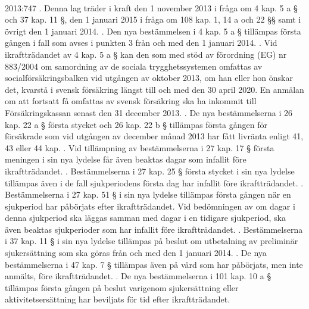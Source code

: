\documentclass[a4paper,notitlepage,openany,10pt]{book}
\begin{document}
\paragraph*{}
2013:747
. Denna lag träder i kraft den 1 november 2013 i fråga om 4 kap. 5 a § och 37 kap. 11 §, den 1 januari 2015 i fråga om 108 kap. 1, 14 a och 22 §§ samt i övrigt den 1 januari 2014.
. Den nya bestämmelsen i 4 kap. 5 a § tillämpas första gången i fall som avses i punkten 3 från och med den 1 januari 2014.
. Vid ikraftträdandet av 4 kap. 5 a § kan den som med stöd av förordning (EG) nr 883/2004 om samordning av de sociala trygghetssystemen omfattas av socialförsäkringsbalken vid utgången av oktober 2013, om han eller hon önskar det, kvarstå i svensk försäkring längst till och med den 30 april 2020. En anmälan om att fortsatt få omfattas av svensk försäkring ska ha inkommit till Försäkringskassan senast den 31 december 2013.
. De nya bestämmelserna i 26 kap. 22 a § första stycket och 26 kap. 22 b § tillämpas första gången för försäkrade som vid utgången av december månad 2013 har fått livränta enligt 41, 43 eller 44 kap.
. Vid tillämpning av bestämmelserna i 27 kap. 17 § första meningen i sin nya lydelse får även beaktas dagar som infallit före ikraftträdandet.
. Bestämmelserna i 27 kap. 25 § första stycket i sin nya lydelse tillämpas även i de fall sjukperiodens första dag har infallit före ikraftträdandet.
. Bestämmelserna i 27 kap. 51 § i sin nya lydelse tillämpas första gången när en sjukperiod har påbörjats efter ikraftträdandet. Vid bedömningen av om dagar i denna sjukperiod ska läggas samman med dagar i en tidigare sjukperiod, ska även beaktas sjukperioder som har infallit före ikraftträdandet.
. Bestämmelserna i 37 kap. 11 § i sin nya lydelse tillämpas på beslut om utbetalning av preliminär sjukersättning som ska göras från och med den 1 januari 2014.
. De nya bestämmelserna i 47 kap. 7 § tillämpas även på vård som har påbörjats, men inte anmälts, före ikraftträdandet.
. De nya bestämmelserna i 101 kap. 10 a § tillämpas första gången på beslut varigenom sjukersättning eller aktivitetsersättning har beviljats för tid efter ikraftträdandet.
\end{document}

